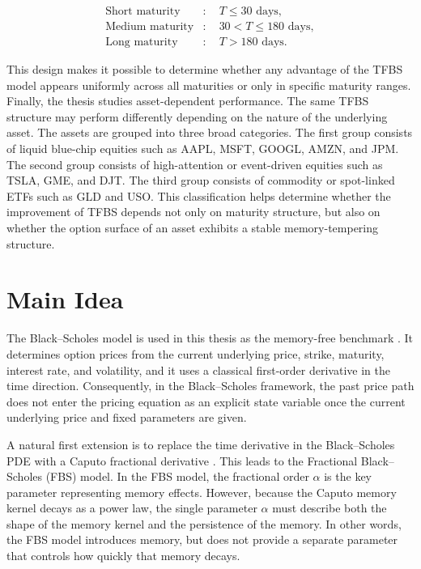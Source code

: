 \documentclass[11pt,a4paper]{report}
\begin{document}
\begin{align*}
\text{Short maturity} &: \quad T \leq 30 \text{ days}, \\
\text{Medium maturity} &: \quad 30 < T \leq 180 \text{ days}, \\
\text{Long maturity} &: \quad T > 180 \text{ days}.
\end{align*}

This design makes it possible to determine whether any advantage of the TFBS model appears uniformly across all maturities or only in specific maturity ranges. Finally, the thesis studies asset-dependent performance. The same TFBS structure may perform differently depending on the nature of the underlying asset. The assets are grouped into three broad categories. The first group consists of liquid blue-chip equities such as AAPL, MSFT, GOOGL, AMZN, and JPM. The second group consists of high-attention or event-driven equities such as TSLA, GME, and DJT. The third group consists of commodity or spot-linked ETFs such as GLD and USO. This classification helps determine whether the improvement of TFBS depends not only on maturity structure, but also on whether the option surface of an asset exhibits a stable memory-tempering structure.

\section{Main Idea}

The Black--Scholes model is used in this thesis as the memory-free benchmark \cite{BlackScholes1973,Merton1973}. It determines option prices from the current underlying price, strike, maturity, interest rate, and volatility, and it uses a classical first-order derivative in the time direction. Consequently, in the Black--Scholes framework, the past price path does not enter the pricing equation as an explicit state variable once the current underlying price and fixed parameters are given.

A natural first extension is to replace the time derivative in the Black--Scholes PDE with a Caputo fractional derivative \cite{Podlubny1999,Wyss2000}. This leads to the Fractional Black--Scholes (FBS) model. In the FBS model, the fractional order $\alpha$ is the key parameter representing memory effects. However, because the Caputo memory kernel decays as a power law, the single parameter $\alpha$ must describe both the shape of the memory kernel and the persistence of the memory. In other words, the FBS model introduces memory, but does not provide a separate parameter that controls how quickly that memory decays.
\end{document}
